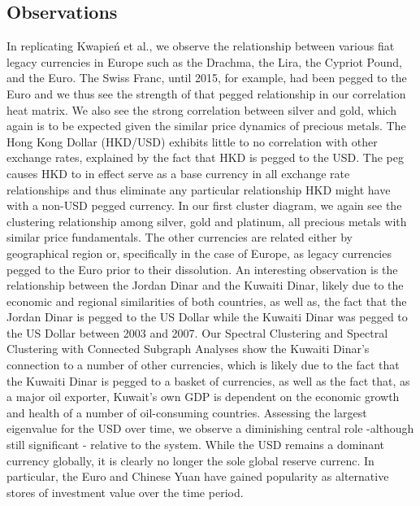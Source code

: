 \documentclass[a4paper]{article}
\begin{document}
\begin{multicols}{2}
\subsection{Observations}
In replicating Kwapień et al., we observe the relationship between various fiat legacy currencies in Europe such as the Drachma, the Lira, the Cypriot Pound, and the Euro. The Swiss Franc, until 2015, for example, had been pegged to the Euro and we thus see the strength of that pegged relationship in our correlation heat matrix. We also see the strong correlation between silver and gold, which again is to be expected given the similar price dynamics of precious metals.
The Hong Kong Dollar (HKD/USD) exhibits little to no correlation with other exchange rates, explained by the fact that HKD is pegged to the USD. The peg causes HKD to in effect serve as a base currency in all exchange rate relationships and thus eliminate any particular relationship HKD might have with a non-USD pegged currency.
In our first cluster diagram, we again see the clustering relationship among silver, gold and platinum, all precious metals with similar price fundamentals. The other currencies are related either by geographical region or, specifically in the case of Europe, as legacy currencies pegged to the Euro prior to their dissolution. An interesting observation is the relationship between the Jordan Dinar and the Kuwaiti Dinar, likely due to the economic and regional similarities of both countries, as well as, the fact that the Jordan Dinar is pegged to the US Dollar while the Kuwaiti Dinar was pegged to the US Dollar between 2003 and 2007.
Our Spectral Clustering and Spectral Clustering with Connected Subgraph Analyses show the Kuwaiti Dinar's connection to a number of other currencies, which is likely due to the fact that the Kuwaiti Dinar is pegged to a basket of currencies, as well as the fact that, as a major oil exporter, Kuwait's own GDP is dependent on the economic growth and health of a number of oil-consuming countries.
Assessing the largest eigenvalue for the USD over time, we observe a diminishing central role -although still significant - relative to the system. While the USD remains a dominant currency globally, it is clearly no longer the sole global reserve currenc. In particular, the Euro and Chinese Yuan have gained popularity as alternative stores of investment value over the time period.


\end{multicols}
\end{document}
